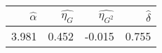 \begin{tabular}{rrrr}
\toprule
 $\hat{\alpha}$ &  $\hat{\eta_G}$ &  $\hat{\eta_{G^{2}}}$ &  $\hat{\delta}$ \\
\midrule
          3.981 &           0.452 &                -0.015 &           0.755 \\
\bottomrule
\end{tabular}
